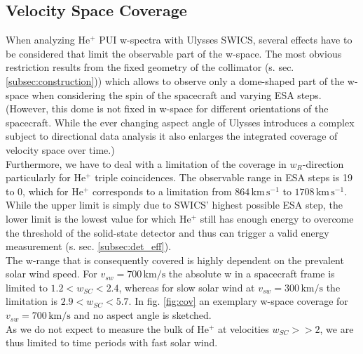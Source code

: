 \subsection{Velocity Space Coverage}
When analyzing $\mathrm{He^{+}}$ PUI w-spectra with Ulysses SWICS, several effects have to be considered that limit the observable part of the w-space. The most obvious restriction results from the fixed geometry of the collimator (s. sec. \ref{subsec:construction})) which allows to observe only a dome-shaped part of the w-space when considering the spin of the spacecraft and varying ESA steps. (However, this dome is not fixed in w-space for different orientations of the spacecraft.
While the ever changing aspect angle of Ulysses introduces a complex subject to directional data analysis it also enlarges the integrated coverage of velocity space over time.)\\
Furthermore, we have to deal with a limitation of the coverage in $w_R$-direction particularly for $\mathrm{He^{+}}$ triple coincidences. The observable range in ESA steps is 19 to 0, which for $\mathrm{He^{+}}$ corresponds to a limitation from $864\,\mathrm{km\,s^{-1}}$ to $1708\,\mathrm{km\,s^{-1}}$. While the upper limit is simply due to SWICS' highest possible ESA step, the lower limit is the lowest value for which $\mathrm{He^{+}}$ still has enough energy to overcome the threshold of the solid-state detector and thus can trigger a valid energy measurement (s. sec. \ref{subsec:det_eff}).\\
The w-range that is consequently covered is highly dependent on the prevalent solar wind speed. For $v_{sw} = 700 \,\mathrm{km/s}$ the absolute w in a spacecraft frame is limited to $1.2 < w_{SC} < 2.4$, whereas for slow solar wind at $v_{sw} = 300 \,\mathrm{km/s}$ the limitation is $2.9 < w_{SC} < 5.7$. 
In fig. \ref{fig:cov} an exemplary w-space coverage for $v_{sw} = 700 \,\mathrm{km/s}$ and no aspect angle is sketched.\\
As we do not expect to measure the bulk of $\mathrm{He^{+}}$ at velocities $w_{SC}>>2$, we are thus limited to time periods with fast solar wind.
